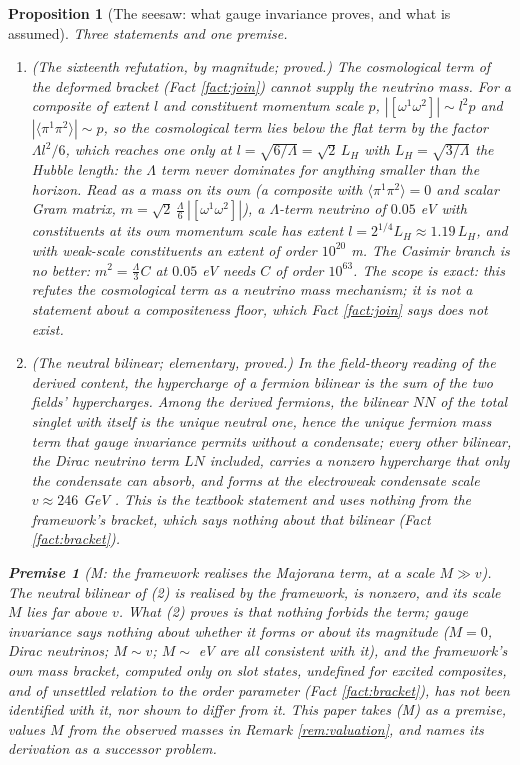 \documentclass[11pt]{article}
\newtheorem{proposition}[theorem]{Proposition}
\theoremstyle{definition}
\newtheorem{premise}[theorem]{Premise}
\newcommand{\br}[1]{\langle #1\rangle}
\newcommand{\LH}{L_{H}}
\begin{document}
\begin{proposition}[The seesaw: what gauge invariance proves, and what is assumed]\label{prop:seesaw}
Three statements and one premise.
\begin{enumerate}
\item \emph{(The sixteenth refutation, by magnitude; proved.)} The cosmological term of the deformed bracket (Fact \ref{fact:join}) cannot supply the neutrino mass. For a composite of extent $l$ and constituent momentum scale $p$, $|[\omega^{1}\omega^{2}]| \sim l^{2}p$ and $|\br{\pi^{1}\pi^{2}}| \sim p$, so the cosmological term lies below the flat term by the factor $\Lambda l^{2}/6$, which reaches one only at $l = \sqrt{6/\Lambda} = \sqrt{2}\,\LH$ with $\LH = \sqrt{3/\Lambda}$ the Hubble length: the $\Lambda$ term never dominates for anything smaller than the horizon. Read as a mass on its own (a composite with $\br{\pi^{1}\pi^{2}} = 0$ and scalar Gram matrix, $m = \sqrt{2}\,\tfrac{\Lambda}{6}\,|[\omega^{1}\omega^{2}]|$), a $\Lambda$-term neutrino of $0.05$ eV with constituents at its own momentum scale has extent $l = 2^{1/4}\LH \approx 1.19\,\LH$, and with weak-scale constituents an extent of order $10^{20}$ m. The Casimir branch is no better: $m^{2} = \tfrac{\Lambda}{3}C$ at $0.05$ eV needs $C$ of order $10^{63}$. The scope is exact: this refutes the cosmological term as a neutrino mass mechanism; it is not a statement about a compositeness floor, which Fact \ref{fact:join} says does not exist.
\item \emph{(The neutral bilinear; elementary, proved.)} In the field-theory reading of the derived content, the hypercharge of a fermion bilinear is the sum of the two fields' hypercharges. Among the derived fermions, the bilinear $N N$ of the total singlet with itself is the unique neutral one, hence the unique fermion mass term that gauge invariance permits without a condensate; every other bilinear, the Dirac neutrino term $L N$ included, carries a nonzero hypercharge that only the condensate can absorb, and forms at the electroweak condensate scale $v \approx 246$ GeV \cite{PDG2024}. This is the textbook statement and uses nothing from the framework's bracket, which says nothing about that bilinear (Fact \ref{fact:bracket}).
\end{enumerate}
\begin{premise}[M: the framework realises the Majorana term, at a scale $M \gg v$]\label{prem:M}
The neutral bilinear of (2) is realised by the framework, is nonzero, and its scale $M$ lies far above $v$. What (2) proves is that nothing forbids the term; gauge invariance says nothing about whether it forms or about its magnitude ($M = 0$, Dirac neutrinos; $M \sim v$; $M \sim$ eV are all consistent with it), and the framework's own mass bracket, computed only on slot states, undefined for excited composites, and of unsettled relation to the order parameter (Fact \ref{fact:bracket}), has not been identified with it, nor shown to differ from it. This paper takes (M) as a premise, values $M$ from the observed masses in Remark \ref{rem:valuation}, and names its derivation as a successor problem.

\end{premise}
\end{proposition}
\end{document}
